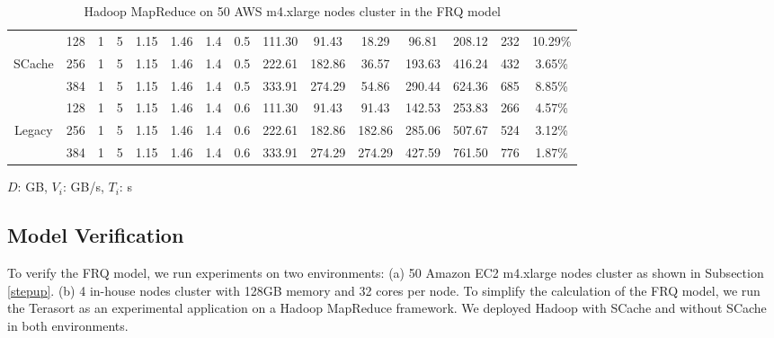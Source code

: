 {\begin{table}
{\begin{tabular}{|c||c|c|c|c|c|c|c||c|c|c|c|c|c|c|}
	\hline
	& 128	& 1 & 5 &	1.15 &	1.46	&	1.4 &	0.5 &	111.30 &	91.43	&	18.29	&	96.81	&	208.12	&	232	&	10.29\%	\\
	SCache
	& 256	& 1 & 5 &	1.15 &	1.46	&	1.4 &	0.5 &	222.61 &	182.86	&	36.57	&	193.63	&	416.24	&	432	&	3.65\%	\\
	& 384	& 1 & 5 &	1.15 &	1.46	&	1.4 &	0.5 &	333.91 &	274.29	&	54.86	&	290.44	&	624.36	&	685 &	8.85\%	\\
	\hline
	& 128	& 1 & 5 &	1.15 &	1.46	&	1.4 &	0.6 &	111.30 &	91.43	&	91.43	&	142.53	&	253.83	&	266 &	4.57\%	\\
	Legacy
	& 256	& 1 & 5 &	1.15 &	1.46	&	1.4 &	0.6 &	222.61 &	182.86	&	182.86	&	285.06	&	507.67	&	524 &	3.12\%	\\
	& 384	& 1 & 5 &	1.15 &	1.46	&	1.4 &	0.6 &	333.91 &	274.29	&	274.29	&	427.59	&	761.50	&	776 &	1.87\%	\\

	\hline
	\end{tabular}
}
\(D\): GB, \(V_{i}\): GB/s, \(T_{i}\): s
\caption{\color{blue}Hadoop MapReduce on 50 AWS m4.xlarge nodes cluster in the FRQ model}
\label{table2}
\end{table}

\subsection{Model Verification}\label{model_verification}
To verify the FRQ model, we run experiments on two environments: (a) 50 Amazon EC2 m4.xlarge nodes cluster as shown in Subsection \ref{stepup}. (b) 4 in-house nodes cluster with 128GB memory and 32 cores per node. To simplify the calculation of the FRQ model, we run the Terasort as an experimental application on a Hadoop MapReduce framework. We deployed Hadoop with SCache and without SCache in both environments.

}
